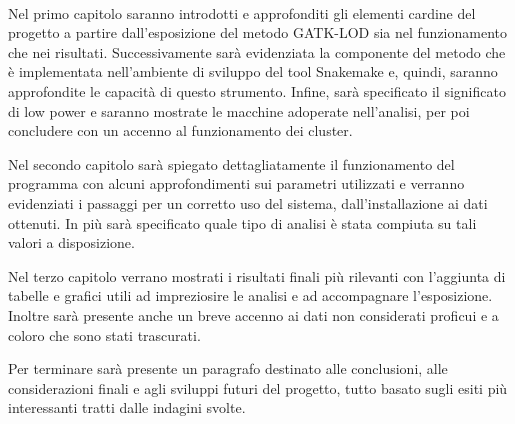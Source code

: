 \documentclass[12pt, a4paper]{report}
\begin{document}
\\
Nel primo capitolo saranno introdotti e approfonditi gli elementi cardine del progetto a partire dall'esposizione del metodo GATK-LOD sia nel funzionamento che nei risultati. Successivamente sarà evidenziata la componente del metodo che è implementata nell'ambiente di sviluppo del tool Snakemake e, quindi, saranno approfondite le capacità di questo strumento. Infine, sarà specificato il significato di low power e saranno mostrate le macchine adoperate nell'analisi, per poi concludere con un accenno al funzionamento dei cluster. 

Nel secondo capitolo sarà spiegato dettagliatamente il funzionamento del programma con alcuni approfondimenti sui parametri utilizzati e verranno evidenziati i passaggi per un corretto uso del sistema, dall'installazione ai dati ottenuti. In più sarà specificato quale tipo di analisi è stata compiuta su tali valori a disposizione.

Nel terzo capitolo verrano mostrati i risultati finali più rilevanti con l'aggiunta di tabelle e grafici utili ad impreziosire le analisi e ad accompagnare l'esposizione. Inoltre sarà presente anche un breve accenno ai dati non considerati proficui e a coloro che sono stati trascurati. 

Per terminare sarà presente un paragrafo destinato alle conclusioni, alle considerazioni finali e agli sviluppi futuri del progetto, tutto basato sugli esiti più interessanti tratti dalle indagini svolte.


\end{document}
